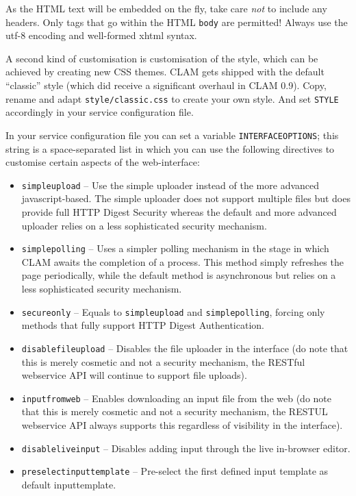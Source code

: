 \documentclass[a4paper,12pt,twoside,openright]{report}
\begin{document}
As the HTML text will be embedded on the fly, take care \emph{not} to include
any headers. Only tags that go within the HTML \texttt{body} are permitted!
Always use the utf-8 encoding and well-formed xhtml syntax.

A second kind of customisation is customisation of the style, which can be
achieved by creating new CSS themes. CLAM gets shipped with the default
``classic'' style (which did receive a significant overhaul in CLAM 0.9). Copy,
rename and adapt \texttt{style/classic.css} to create your own style. And set
\texttt{STYLE} accordingly in your service configuration file.

In your service configuration file you can set a variable
\texttt{INTERFACEOPTIONS}; this string is a space-separated list in which you
can use the following directives to customise certain aspects of the
web-interface:

\begin{itemize}
\item \texttt{simpleupload} -- Use the simple uploader instead of the more advanced javascript-based. The simple uploader does not support multiple files but does provide full HTTP Digest Security whereas the default and more advanced uploader relies on a less sophisticated security mechanism.
\item \texttt{simplepolling} -- Uses a simpler polling mechanism in the stage
  in which CLAM awaits the completion of a process. This method simply
  refreshes the page periodically, while the default method is asynchronous but relies on a less sophisticated security mechanism. 
\item \texttt{secureonly} -- Equals to \texttt{simpleupload} and \texttt{simplepolling}, forcing only methods that fully support HTTP Digest Authentication.
\item \texttt{disablefileupload} -- Disables the file uploader in the interface (do note that this is merely cosmetic and not a security mechanism, the RESTful webservice API will continue to support file uploads).
\item \texttt{inputfromweb} -- Enables downloading an input file from the web (do note that this is merely cosmetic and not a security mechanism, the RESTUL webservice API always supports this regardless of visibility in the interface).
\item \texttt{disableliveinput} -- Disables adding input through the live in-browser editor. 
\item \texttt{preselectinputtemplate} -- Pre-select the first defined input template as default inputtemplate.
\end{itemize}
\end{document}
